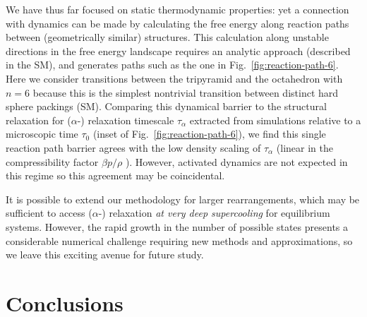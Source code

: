 \documentclass[11pt,twoside]{report}
\begin{document}
We have thus far focused on static thermodynamic properties: yet a connection with dynamics can be made by calculating the free energy along reaction paths between (geometrically similar) structures.
This calculation along unstable directions in the free energy landscape requires an analytic approach (described in the SM), and generates paths such as the one in Fig.\ \ref{fig:reaction-path-6}.
Here we consider transitions between the tripyramid and the octahedron with $n=6$ because this is the simplest nontrivial transition between distinct hard sphere packings (SM).
Comparing this dynamical barrier to the structural relaxation for ($\alpha$-) relaxation timescale $\tau_\alpha$ extracted from simulations relative to a microscopic time $\tau_0$ (inset of Fig.\ \ref{fig:reaction-path-6}), we find this single reaction path barrier agrees with the low density scaling of $\tau_\alpha$ (linear in the compressibility factor $\beta p / \rho$ \cite{BerthierPRE2009}).
However, activated dynamics are not expected in this regime so this agreement may be coincidental.


It is possible to extend our methodology for larger rearrangements, which may be sufficient to access ($\alpha$-) relaxation \emph{at very deep supercooling} for equilibrium systems.
However, the rapid growth in the number of possible states presents a considerable numerical challenge requiring new methods and approximations, so we leave this exciting avenue for future study.

\section{Conclusions}
\end{document}
